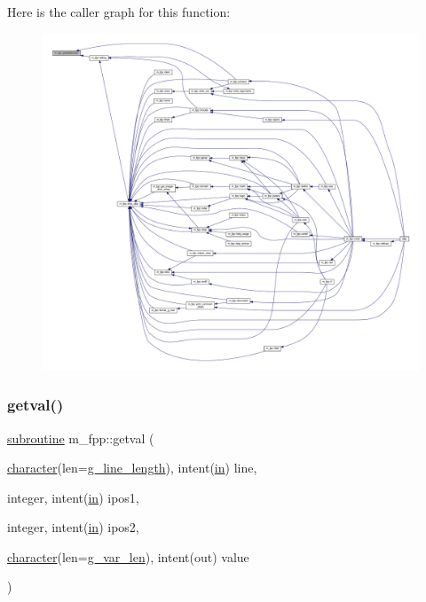 Here is the caller graph for this function\+:
\nopagebreak
\begin{figure}[H]
\begin{center}
\leavevmode
\includegraphics[width=350pt]{namespacem__fpp_aa52b30ff734a7831d3334aee5ef4e8e7_icgraph}
\end{center}
\end{figure}
\mbox{\label{namespacem__fpp_a77ebcaafb7e1396c68dbc0bdcc088232}} 
\subsubsection{\texorpdfstring{getval()}{getval()}}
{\footnotesize\ttfamily \hyperlink{M__stopwatch_83_8txt_acfbcff50169d691ff02d4a123ed70482}{subroutine} m\+\_\+fpp\+::getval (\begin{DoxyParamCaption}\item[{\hyperlink{option__stopwatch_83_8txt_abd4b21fbbd175834027b5224bfe97e66}{character}(len=\hyperlink{namespacem__fpp_ab93f8756cf248cf8db932573009d4664}{g\+\_\+line\+\_\+length}), intent(\hyperlink{M__journal_83_8txt_afce72651d1eed785a2132bee863b2f38}{in})}]{line,  }\item[{integer, intent(\hyperlink{M__journal_83_8txt_afce72651d1eed785a2132bee863b2f38}{in})}]{ipos1,  }\item[{integer, intent(\hyperlink{M__journal_83_8txt_afce72651d1eed785a2132bee863b2f38}{in})}]{ipos2,  }\item[{\hyperlink{option__stopwatch_83_8txt_abd4b21fbbd175834027b5224bfe97e66}{character}(len=\hyperlink{namespacem__fpp_a99c57ea4a304975a7afafcf0b292db06}{g\+\_\+var\+\_\+len}), intent(out)}]{value }\end{DoxyParamCaption})}



